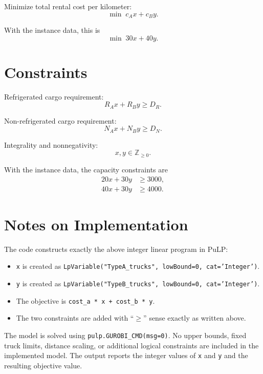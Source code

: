 Minimize total rental cost per kilometer:
\[
\min \; c_A x + c_B y.
\]

With the instance data, this is
\[
\min \; 30x + 40y.
\]

\section*{Constraints}

Refrigerated cargo requirement:
\[
R_A x + R_B y \ge D_R.
\]

Non-refrigerated cargo requirement:
\[
N_A x + N_B y \ge D_N.
\]

Integrality and nonnegativity:
\[
x, y \in \mathbb{Z}_{\ge 0}.
\]

With the instance data, the capacity constraints are
\begin{align*}
20x + 30y &\ge 3000,\\
40x + 30y &\ge 4000.
\end{align*}

\section*{Notes on Implementation}

The code constructs exactly the above integer linear program in PuLP:
\begin{itemize}
\item \texttt{x} is created as \texttt{LpVariable("TypeA\_trucks", lowBound=0, cat='Integer')}.
\item \texttt{y} is created as \texttt{LpVariable("TypeB\_trucks", lowBound=0, cat='Integer')}.
\item The objective is \texttt{cost\_a * x + cost\_b * y}.
\item The two constraints are added with ``\(\ge\)'' sense exactly as written above.
\end{itemize}

The model is solved using \texttt{pulp.GUROBI\_CMD(msg=0)}. No upper bounds, fixed truck limits, distance scaling, or additional logical constraints are included in the implemented model. The output reports the integer values of \texttt{x} and \texttt{y} and the resulting objective value.
